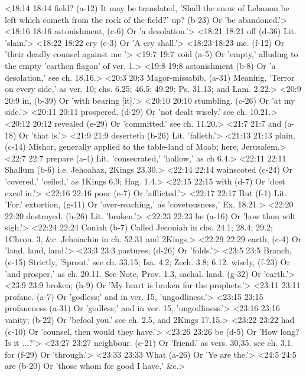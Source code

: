 <18:14 18:14  field? (a-12)  It may be translated, 'Shall the snow of Lebanon be left  which cometh from the rock of the field?'
  up? (b-23)  Or 'be abandoned.'>
<18:16 18:16  astonishment, (c-6)  Or 'a desolation.'>
<18:21 18:21  off (d-36)  Lit. 'slain.'>
<18:22 18:22  cry (e-3)  Or 'A cry shall.'>
<18:23 18:23  me. (f-12)  Or 'their deadly counsel against me '>
<19:7 19:7  void (a-5)  Or 'empty,' alluding to the empty 'earthen flagon' of ver. 1.>
<19:8 19:8  astonishment (b-8)  Or 'a desolation,' see ch. 18.16.>
<20:3 20:3  Magor-missabib. (a-31)  Meaning, 'Terror on every side,' as ver. 10; chs. 6.25; 46.5;  49.29; Ps. 31.13; and Lam. 2.22.>
<20:9 20:9  in, (b-39)  Or 'with bearing [it].'>
<20:10 20:10  stumbling. (c-26)  Or 'at my side.'>
<20:11 20:11  prospered. (d-29)  Or 'not dealt wisely.' see ch. 10.21.>
<20:12 20:12  revealed (e-29)  Or 'committed.' see ch. 11.20.>
<21:7 21:7  and (a-18)  Or 'that is.'>
<21:9 21:9  deserteth (b-26)  Lit. 'falleth.'>
<21:13 21:13  plain, (c-14)  Mishor, generally applied to the table-land of Moab; here,  Jerusalem.>
<22:7 22:7  prepare (a-4)  Lit. 'consecrated,' 'hallow,' as ch 6.4.>
<22:11 22:11  Shallum (b-6)  i.e. Jehoahaz, 2Kings 23.30.>
<22:14 22:14  wainscoted (c-24)  Or 'covered,' 'ceiled,' as 1Kings 6.9; Hag. 1.4.>
<22:15 22:15  with (d-7)  Or 'dost excel in.'>
<22:16 22:16  poor (e-7)  Or 'afflicted.'>
<22:17 22:17  But (f-1)  Lit. 'For.'
  extortion, (g-11)  Or 'over-reaching,' as 'covetousness,' Ex. 18.21.>
<22:20 22:20  destroyed. (h-26)  Lit. 'broken.'>
<22:23 22:23  be (a-16)  Or 'how thou wilt sigh.'>
<22:24 22:24  Coniah (b-7)  Called Jeconiah in chs. 24.1; 28.4; 29.2; 1Chron. 3, &c.  Jehoiachin in ch. 52.31 and 2Kings.>
<22:29 22:29  earth, (c-4)  Or 'land, land, land.'>
<23:3 23:3  pastures; (d-26)  Or 'folds.'>
<23:5 23:5  Branch, (e-15)  Strictly, 'Sprout.' see ch. 33.15; Isa. 4.2; Zech. 3.8; 6.12.
  wisely, (f-23)  Or 'and prosper,' as ch. 20.11. See Note, Prov. 1.3,  sachal.
  land. (g-32)  Or 'earth.'>
<23:9 23:9  broken; (h-9)  Or 'My heart is broken for the prophets.'>
<23:11 23:11  profane. (a-7) Or 'godless;' and in ver. 15, 'ungodliness.'>
<23:15 23:15  profaneness (a-31)  Or 'godless;' and in ver. 15, 'ungodliness.'>
<23:16 23:16  vanity; (b-22)  Or 'befool you.' see ch. 2.5, and 2Kings 17.15.>
<23:22 23:22  had (c-10)  Or 'counsel, then would they have.'>
<23:26 23:26  be (d-5)  Or 'How long? Is it ...?'>
<23:27 23:27  neighbour. (e-21)  Or 'friend.' as vers. 30,35. see ch. 3.1.
  for (f-29)  Or 'through.'>
<23:33 23:33  What (a-26)  Or 'Ye are the.'>
<24:5 24:5  are (b-20)  Or 'those whom for good I have,' &c.>
